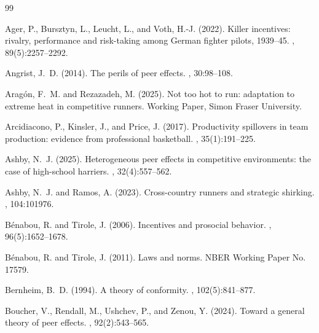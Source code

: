\documentclass[12pt]{article}
\theoremstyle{definition}
\theoremstyle{remark}
\begin{document}
\clearpage
\singlespacing

\begin{thebibliography}{99}

Ager, P., Bursztyn, L., Leucht, L., and Voth, H.-J. (2022).
\newblock Killer incentives: rivalry, performance and risk-taking among German
fighter pilots, 1939--45.
, 89(5):2257--2292.

Angrist, J.~D. (2014).
\newblock The perils of peer effects.
, 30:98--108.

Arag\'on, F.~M. and Rezazadeh, M. (2025).
\newblock Not too hot to run: adaptation to extreme heat in competitive runners.
\newblock Working Paper, Simon Fraser University.

Arcidiacono, P., Kinsler, J., and Price, J. (2017).
\newblock Productivity spillovers in team production: evidence from
professional basketball.
, 35(1):191--225.

Ashby, N.~J. (2025).
\newblock Heterogeneous peer effects in competitive environments: the case of
high-school harriers.
, 32(4):557--562.

Ashby, N.~J. and Ramos, A. (2023).
\newblock Cross-country runners and strategic shirking.
, 104:101976.

B\'enabou, R. and Tirole, J. (2006).
\newblock Incentives and prosocial behavior.
, 96(5):1652--1678.

B\'enabou, R. and Tirole, J. (2011).
\newblock Laws and norms.
\newblock NBER Working Paper No. 17579.

Bernheim, B.~D. (1994).
\newblock A theory of conformity.
, 102(5):841--877.

Boucher, V., Rendall, M., Ushchev, P., and Zenou, Y. (2024).
\newblock Toward a general theory of peer effects.
, 92(2):543--565.


\end{thebibliography}
\end{document}
